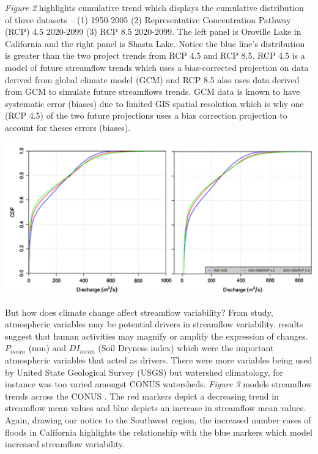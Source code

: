 \documentclass[a4paper,man,biblatex]{apa7}
\begin{document}
\vspace{1ex}
\par \textit{Figure 2} highlights cumulative trend which displays the cumulative distribution of three datasets -- (1) 1950-2005 (2) Representative Concentration Pathway (RCP) 4.5 2020-2099 (3) RCP 8.5 2020-2099. The left panel is Oroville Lake in California and the right panel is Shasta Lake. Notice the blue line's distribution is greater than the two project trends from RCP 4.5 and RCP 8.5. RCP 4.5 is a model of future streamflow trends which uses a bias-corrected projection on data derived from global climate model (GCM) and RCP 8.5 also uses data derived from GCM to simulate future streamflows trends. GCM data is known to have systematic error (biases) due to limited GIS spatial resolution which is why one (RCP 4.5) of the two future projections uses a bias correction projection to account for theses errors (biases).\\
\begin{minipage}{0.5\linewidth}   
    \centering
    \includegraphics[scale=0.40]{cdf_streamflow.png}
\end{minipage}
\par But how does climate change affect streamflow variability? From \textcite{rice_2016} study, atmospheric variables may be potential drivers in streamflow variability. \textcite{rice_2016} results suggest that human activities may magnify or amplify the expression of changes. $P_\textit{mean}$ (mm) and $DI_\textit{mean}$ (Soil Dryness index) which were the important atmospheric variables that acted as drivers. There were more variables being used by United State Geological Survey (USGS) but watershed climatology, for instance was too varied amongst CONUS watersheds. \textit{Figure 3} models streamflow trends across the CONUS \autocite{rice_2016}. The red markers depict a decreasing trend in streamflow mean values and blue depicts an increase in streamflow mean values. Again, drawing our notice to the Southwest region, the increased number cases of floods in California highlights the relationship with the blue markers which model increased streamflow variability. \\
\end{document}
